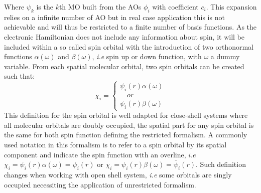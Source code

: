 \documentclass[10pt]{report}
\numberwithin{equation}{section}
\begin{document}
Where $\psi_k$ is the $k$th MO built from the AOs $\phi_i$ with coefficient $c_i$. 
This expansion relies on a infinite number of AO but in real case application this is not achievable and will thus be restricted to a finite number of basis functions.
As the electronic Hamiltonian does not include any information about spin, it will be included within a so called spin orbital with the introduction of two orthonormal functions $\alpha(\omega)$ and $\beta(\omega)$, \textit{i.e} spin up or down function, with $\omega$ a dummy variable.
From each spatial molecular orbital, two spin orbitals can be created such that:
\begin{equation}
    \chi_i=\begin{cases}
    \psi_i(r)\alpha(\omega)\\
    \quad or \\
    \psi_i(r)\beta(\omega)
    \end{cases}
\end{equation}
This definition for the spin orbital is well adapted for close-shell systems where all molecular orbitals are doubly occupied, the spatial part for any spin orbital is the same for both spin function defining the restricted formalism.
A commonly used notation in this formalism is to refer to a spin orbital by its spatial component and indicate the spin function with an overline, $i.e$ $\chi_i=\psi_i(r)\alpha(\omega)=\psi_i(r)$ or $\chi_i=\psi_i(r)\beta(\omega)=\overline{\psi}_i(r)$.
Such definition changes when working with open shell system, \textit{i.e} some orbitals are singly occupied necessiting the application of unrestricted formalism.
\end{document}
